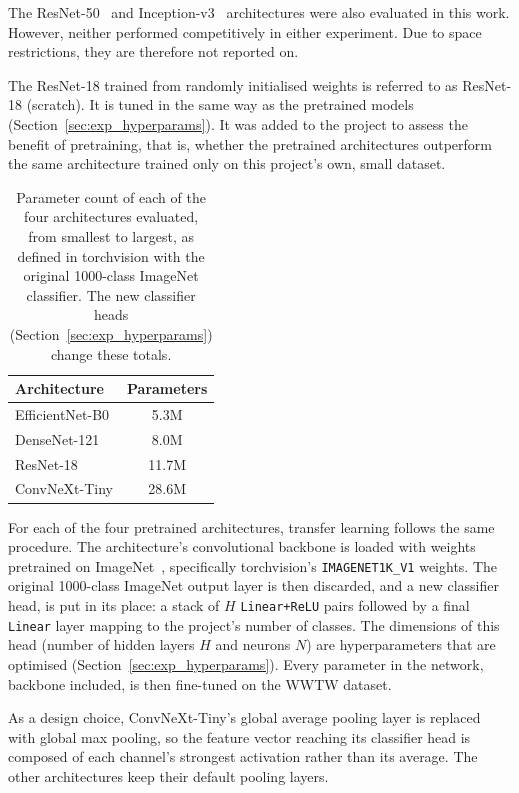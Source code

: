 The ResNet-50~\citep{he2016resnet} and Inception-v3~\citep{szegedy2016inception} architectures were also evaluated in this work. However, neither performed competitively in either experiment. Due to space restrictions, they are therefore not reported on.

The ResNet-18 trained from randomly initialised weights is referred to as ResNet-18 (scratch). It is tuned in the same way as the pretrained models (Section~\ref{sec:exp_hyperparams}). It was added to the project to assess the benefit of pretraining, that is, whether the pretrained architectures outperform the same architecture trained only on this project's own, small dataset.

\begin{table}[htbp]
\centering
\caption{Parameter count of each of the four architectures evaluated, from smallest to largest, as defined in torchvision with the original 1000-class ImageNet classifier. The new classifier heads (Section~\ref{sec:exp_hyperparams}) change these totals.}
\label{tab:arch_sizes}
\begin{tabular}{lc}
\toprule
\textbf{Architecture} & \textbf{Parameters} \\
\midrule
EfficientNet-B0 & 5.3M \\
DenseNet-121    & 8.0M \\
ResNet-18       & 11.7M \\
ConvNeXt-Tiny   & 28.6M \\
\bottomrule
\end{tabular}
\end{table}

For each of the four pretrained architectures, transfer learning follows the same procedure. The architecture's convolutional backbone is loaded with weights pretrained on ImageNet~\citep{deng2009imagenet, russakovsky2015imagenet}, specifically torchvision's \texttt{IMAGENET1K\_V1} weights. The original 1000-class ImageNet output layer is then discarded, and a new classifier head, is put in its place: a stack of $H$ \texttt{Linear+ReLU} pairs followed by a final \texttt{Linear} layer mapping to the project's number of classes. The dimensions of this head (number of hidden layers $H$ and neurons $N$) are hyperparameters that are optimised (Section~\ref{sec:exp_hyperparams}). Every parameter in the network, backbone included, is then fine-tuned on the WWTW dataset.

As a design choice, ConvNeXt-Tiny's global average pooling layer is replaced with global max pooling, so the feature vector reaching its classifier head is composed of each channel's strongest activation rather than its average. The other architectures keep their default pooling layers.

